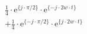 \correct
\[
\begin{split}
& \frac{1}{4} \cdot \textrm{e}^{\{ j \cdot \pi/2 \}} \cdot \textrm{e}^{\{-j \cdot 2w \cdot t \}} \\
&+\frac{1}{4} \cdot \textrm{e}^{\{-j \cdot \pi/2 \}} \cdot \textrm{e}^{\{ j \cdot 2w \cdot t \}} 
\end{split}
\]
